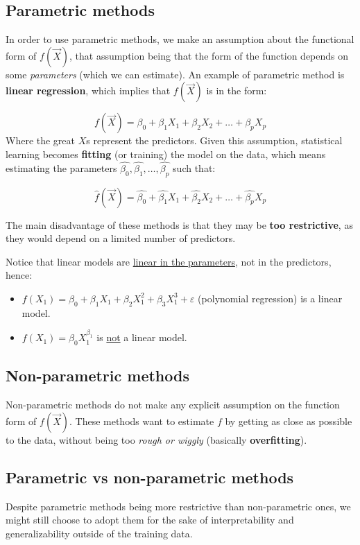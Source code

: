     \subsection{Parametric methods}
      In order to use parametric methods, we make an assumption about the
      functional form of $f(\vec{X})$, that assumption being that the form of
      the function depends on some \textit{parameters} (which we can estimate).
      An example of parametric method is \textbf{linear regression}, which
      implies that $f(\vec{X})$ is in the form:

      $$f(\vec{X}) = \beta_0 + \beta_1 X_1 + \beta_2 X_2 + \dots + \beta_p X_p$$
      Where the great $X$s represent the predictors. Given this assumption,
      statistical learning becomes \textbf{fitting} (or training) the model on
      the data, which means estimating the parameters $\hat{\beta_0},
      \hat{\beta_1}, \dots, \hat{\beta_p}$ such that:

      $$\hat{f}(\vec{X}) = \hat{\beta_0} + \hat{\beta_1} X_1 + \hat{\beta_2} X_2
      + \dots + \hat{\beta_p} X_p$$

      The main disadvantage of these methods is that they may be \textbf{too
      restrictive}, as they would depend on a limited number of predictors.

      Notice that linear models are \underline{linear in the parameters}, not in
      the predictors, hence:
      \begin{itemize}
        \item $f(X_1) = \beta_0 + \beta_1 X_1 + \beta_2 X_1^2 + \beta_3 X_1^3 +
        \varepsilon$ (polynomial regression) is a linear model.
        \item $f(X_1) = \beta_0 X_1^{\beta_1}$ is \underline{not} a linear
        model.
      \end{itemize}

    \subsection{Non-parametric methods}
      Non-parametric methods do not make any explicit assumption on the function
      form of $f(\vec{X})$. These methods want to estimate $f$ by getting as
      close as possible to the data, without being too \textit{rough or wiggly}
      (basically \textbf{overfitting}).

    \subsection{Parametric vs non-parametric methods}
      Despite parametric methods being more restrictive than non-parametric
      ones, we might still choose to adopt them for the sake of interpretability
      and generalizability outside of the training data. %

